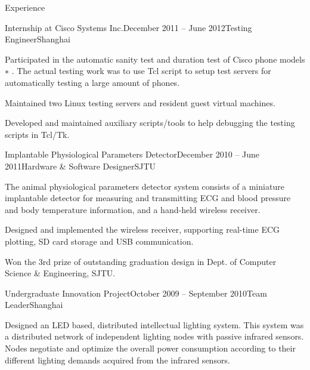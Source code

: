 \documentclass{resume} %
\begin{document}
\begin{rSection}{Experience}
    \begin{rSubsection}{Internship at Cisco Systems Inc.}{December 2011 -- June 2012}{Testing Engineer}{Shanghai}

    \item Participated in the automatic sanity test and duration test of Cisco
        phone models$∗$ . The actual testing work was to use Tcl script to
        setup test servers for automatically testing a large amount of phones.

    \item Maintained two Linux testing servers and resident guest virtual
        machines.

    \item Developed and maintained auxiliary scripts/tools to help debugging
        the testing scripts in Tcl/Tk.

    \end{rSubsection}

    \begin{rSubsection}{Implantable Physiological Parameters Detector}{December 2010 -- June 2011}{Hardware \& Software Designer}{SJTU}

    \item The animal physiological parameters detector system consists of a
        miniature implantable detector for measuring and transmitting ECG and
        blood pressure and body temperature information, and a hand-held
        wireless receiver.

    \item Designed and implemented the wireless receiver, supporting real-time
        ECG plotting, SD card storage and USB communication.

    \item Won the 3rd prize of outstanding graduation design in Dept. of Computer
        Science \& Engineering, SJTU.

    \end{rSubsection}

    \begin{rSubsection}{Undergraduate Innovation Project}{October 2009 -- September 2010}{Team Leader}{Shanghai}

    \item Designed an LED based, distributed intellectual lighting system. This
        system was a distributed network of independent lighting nodes with
        passive infrared sensors. Nodes negotiate and optimize the overall
        power consumption according to their different lighting demands
        acquired from the infrared sensors.


\end{rSubsection}
\end{rSection}
\end{document}
